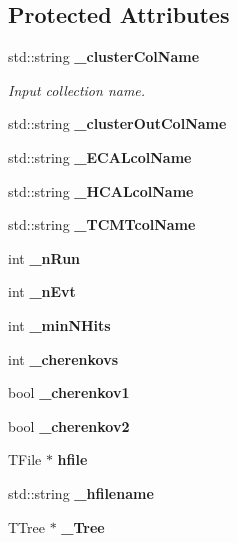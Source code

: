 \subsection*{Protected Attributes}
\begin{CompactItemize}
\item 
std::string {\bf \_\-cluster\-Col\-Name}\label{classCaliceEcalHitInfo_p0}

\begin{CompactList}\small\item\em Input collection name. \item\end{CompactList}\item 
std::string {\bf \_\-cluster\-Out\-Col\-Name}\label{classCaliceEcalHitInfo_p1}

\item 
std::string {\bf \_\-ECALcol\-Name}\label{classCaliceEcalHitInfo_p2}

\item 
std::string {\bf \_\-HCALcol\-Name}\label{classCaliceEcalHitInfo_p3}

\item 
std::string {\bf \_\-TCMTcol\-Name}\label{classCaliceEcalHitInfo_p4}

\item 
int {\bf \_\-n\-Run}\label{classCaliceEcalHitInfo_p5}

\item 
int {\bf \_\-n\-Evt}\label{classCaliceEcalHitInfo_p6}

\item 
int {\bf \_\-min\-NHits}\label{classCaliceEcalHitInfo_p7}

\item 
int {\bf \_\-cherenkovs}\label{classCaliceEcalHitInfo_p8}

\item 
bool {\bf \_\-cherenkov1}\label{classCaliceEcalHitInfo_p9}

\item 
bool {\bf \_\-cherenkov2}\label{classCaliceEcalHitInfo_p10}

\item 
TFile $\ast$ {\bf hfile}\label{classCaliceEcalHitInfo_p11}

\item 
std::string {\bf \_\-hfilename}\label{classCaliceEcalHitInfo_p12}

\item 
TTree $\ast$ {\bf \_\-Tree}\label{classCaliceEcalHitInfo_p13}


\end{CompactItemize}
